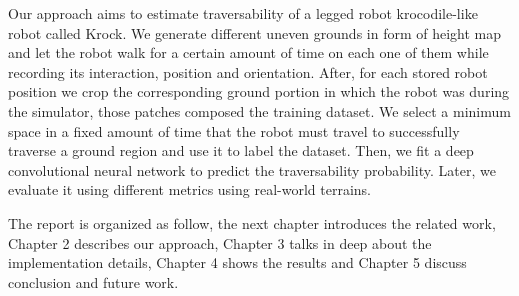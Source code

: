 Our approach aims to estimate traversability of a legged robot krocodile-like robot called Krock. We generate different uneven grounds in form of height map and let the robot walk for a certain amount of time on each one of them while recording its interaction, position and orientation. After, for each stored robot position we crop the corresponding ground portion in which the robot was during the simulator, those patches composed the training dataset. We select a minimum space in a fixed amount of time that the robot must travel to successfully traverse a ground region and use it to label the dataset. Then, we fit a deep convolutional neural network to predict the traversability probability. Later, we evaluate it using different metrics using real-world terrains.

The report is organized as follow, the next chapter introduces the related work, Chapter 2 describes our approach, Chapter 3 talks in deep about the implementation details,
Chapter 4 shows the results and Chapter 5 discuss conclusion and future work.
